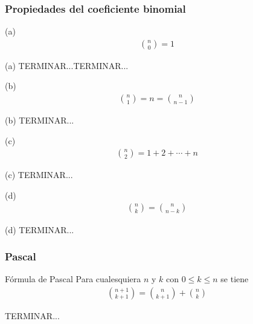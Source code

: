 		\subsubsection{Propiedades del coeficiente binomial}
			\begin{property}{(a)}
				\begin{align*}
					\binom{n}{0}=1
				\end{align*}    
			\end{property}
			\begin{demostration}{(a)}
				TERMINAR...TERMINAR...
			\end{demostration}
			\begin{property}{(b)}
				\begin{align*}
					\binom{n}{1}=n=\binom{n}{n-1}
				\end{align*}    
			\end{property}
			\begin{demostration}{(b)}
				TERMINAR...
			\end{demostration}
			\begin{property}{(c)}
				\begin{align*}
					\binom{n}{2}=1+2+\dotsb+n
				\end{align*}    
			\end{property}
			\begin{demostration}{(c)}
				TERMINAR...
			\end{demostration}
			\begin{property}{(d)}
				\begin{align*}
					\binom{n}{k}=\binom{n}{n-k}
				\end{align*}    
			\end{property}
			\begin{demostration}{(d)}
				TERMINAR...
			\end{demostration}
		\subsubsection{Pascal}
			\begin{theorem}{Fórmula de Pascal}
				Para cualesquiera $n$ y $k$ con $0\le k\le n$  se tiene
				\begin{align*}
					\binom{n+1}{k+1}=\binom{n}{k+1}+\binom{n}{k}
				\end{align*}
			\end{theorem}    
			\begin{demostration}{}
				TERMINAR...
			\end{demostration}
